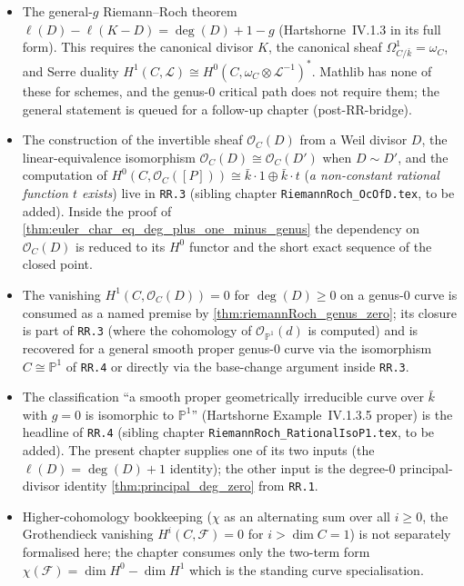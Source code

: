 \begin{itemize}
  \item The general-\(g\) Riemann--Roch theorem
    \(\ell(D) - \ell(K - D) = \deg(D) + 1 - g\) (Hartshorne~IV.1.3 in
    its full form). This requires the canonical divisor \(K\), the
    canonical sheaf \(\Omega^1_{C / \bar k} = \omega_C\), and
    Serre duality $H^1(C, \mathcal L) \cong H^0(C, \omega_C \otimes
    \mathcal L^{-1})^*$. Mathlib has none of these for schemes, and
    the genus-\(0\) critical path does not require them; the general
    statement is queued for a follow-up chapter (post-RR-bridge).
  \item The construction of the invertible sheaf \(\mathcal O_C(D)\)
    from a Weil divisor \(D\), the linear-equivalence isomorphism
    \(\mathcal O_C(D) \cong \mathcal O_C(D')\) when \(D \sim D'\), and
    the computation of $H^0(C, \mathcal O_C([P])) \cong \bar k \cdot
    1 \oplus \bar k \cdot t$ (\emph{a non-constant rational function
    \(t\) exists}) live in \texttt{RR.3} (sibling chapter
    \texttt{RiemannRoch\_OcOfD.tex}, to be added). Inside the proof
    of \cref{thm:euler_char_eq_deg_plus_one_minus_genus} the dependency on
    \(\mathcal O_C(D)\) is reduced to its \(H^0\) functor and the short
    exact sequence of the closed point.
  \item The vanishing \(H^1(C, \mathcal O_C(D)) = 0\) for
    \(\deg(D) \geq 0\) on a genus-\(0\) curve is consumed as a named
    premise by \cref{thm:riemannRoch_genus_zero}; its closure is
    part of \texttt{RR.3} (where the cohomology of
    \(\mathcal O_{\mathbb P^1}(d)\) is computed) and is recovered for
    a general smooth proper genus-\(0\) curve via the isomorphism
    \(C \cong \mathbb P^1\) of \texttt{RR.4} or directly via the
    base-change argument inside \texttt{RR.3}.
  \item The classification ``a smooth proper geometrically irreducible
    curve over \(\bar k\) with \(g = 0\) is isomorphic to
    \(\mathbb P^1\)'' (Hartshorne Example~IV.1.3.5 proper) is the
    headline of \texttt{RR.4} (sibling chapter
    \texttt{RiemannRoch\_RationalIsoP1.tex}, to be added). The
    present chapter supplies one of its two inputs (the $\ell(D) =
    \deg(D) + 1$ identity); the other input is the degree-$0$
    principal-divisor identity \cref{thm:principal_deg_zero} from
    \texttt{RR.1}.
  \item Higher-cohomology bookkeeping (\(\chi\) as an alternating sum
    over all \(i \geq 0\), the Grothendieck vanishing
    \(H^i(C, \mathcal F) = 0\) for \(i > \dim C = 1\)) is not separately
    formalised here; the chapter consumes only the two-term form
    \(\chi(\mathcal F) = \dim H^0 - \dim H^1\) which is the standing
    curve specialisation.
\end{itemize}
